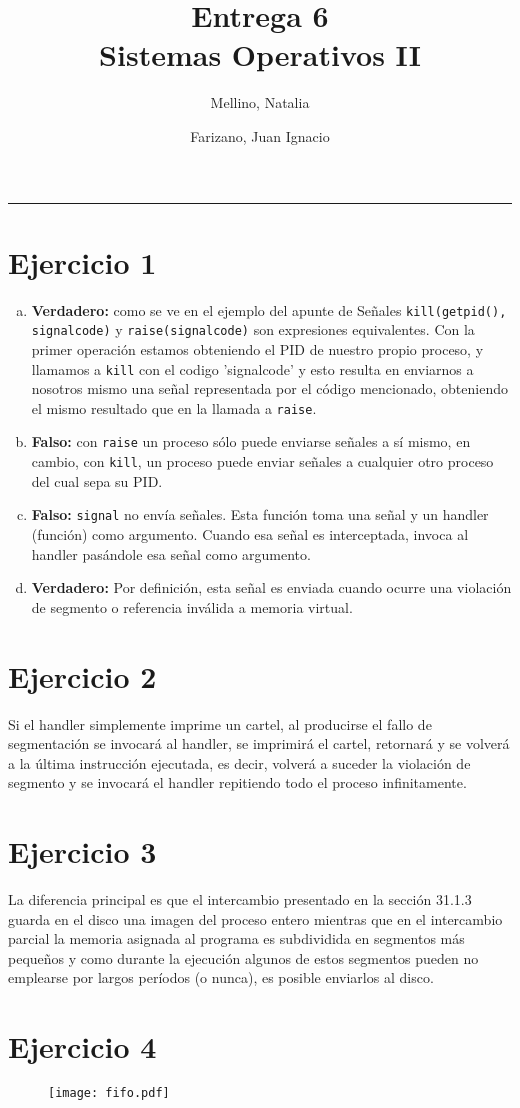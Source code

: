 \documentclass[11pt]{article}
\title{
    Entrega 6 \\
    \large Sistemas Operativos II}
\author{Mellino, Natalia \and Farizano, Juan Ignacio}
\date{}
\begin{document}
\maketitle

\noindent\rule{\textwidth}{1pt}

\section*{Ejercicio 1}

\begin{enumerate}[a)]
  \item \textbf{Verdadero:} como se ve en el ejemplo del apunte de Señales
        \texttt{kill(getpid(), signalcode)} y \texttt{raise(signalcode)} son
        expresiones equivalentes. Con la primer operación estamos obteniendo
        el PID de nuestro propio proceso, y llamamos a \texttt{kill} con el codigo
        'signalcode' y esto resulta en enviarnos a nosotros mismo una señal
        representada por el código mencionado, obteniendo el mismo resultado
        que en la llamada a \texttt{raise}.
  \item \textbf{Falso:} con \texttt{raise} un proceso sólo puede enviarse señales
        a sí mismo, en cambio, con \texttt{kill}, un proceso puede enviar señales
        a cualquier otro proceso del cual sepa su PID.
  \item \textbf{Falso:} \texttt{signal} no envía señales. Esta función toma una señal
        y un handler (función) como argumento. Cuando esa señal es interceptada, invoca
        al handler pasándole esa señal como argumento.
  \item \textbf{Verdadero:} Por definición, esta señal es enviada cuando ocurre
        una violación de segmento o referencia inválida a memoria virtual.
\end{enumerate}

\section*{Ejercicio 2}

Si el handler simplemente imprime un cartel, al producirse el fallo de segmentación
se invocará al handler, se imprimirá el cartel, retornará y se volverá a la última
instrucción ejecutada, es decir, volverá a suceder la violación de segmento y se 
invocará el handler repitiendo todo el proceso infinitamente.

\section*{Ejercicio 3}
La diferencia principal es que el intercambio presentado en la sección 31.1.3
guarda en el disco una imagen del proceso entero mientras que en el 
intercambio parcial la memoria asignada al programa es subdividida en 
segmentos más pequeños y como durante la ejecución algunos de estos
segmentos pueden no emplearse por largos períodos (o nunca), es posible
enviarlos al disco.

\section*{Ejercicio 4}
\begin{figure}[h!]
  \begin{center}
    \texttt{[image: fifo.pdf]}
  \end{center}
\end{figure}
\end{document}
